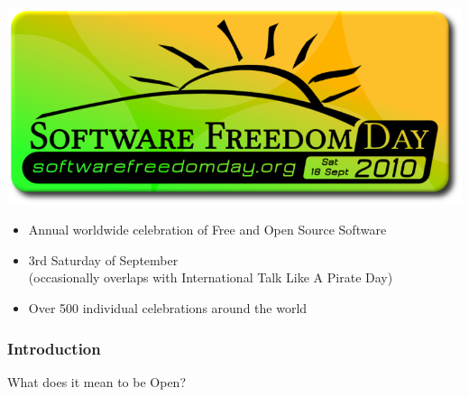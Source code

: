 \documentclass{beamer}
\begin{document}
\begin{frame}
  \vspace{-1em}
  \begin{center} \includegraphics[height=0.50\textheight]{img/sfd} \end{center}
  \begin{large}
    \begin{itemize}
    \item Annual worldwide celebration of Free and Open Source
      Software
    \item 3rd Saturday of September \\ (occasionally overlaps with
      International Talk Like A Pirate Day)
    \item Over 500 individual celebrations around the world
    \end{itemize}
  \end{large}

\end{frame}

\begin{frame}
  \frametitle{Introduction}
  \begin{center}\begin{LARGE}What does it mean to be Open?\end{LARGE}\end{center}
\end{frame}
\end{document}
